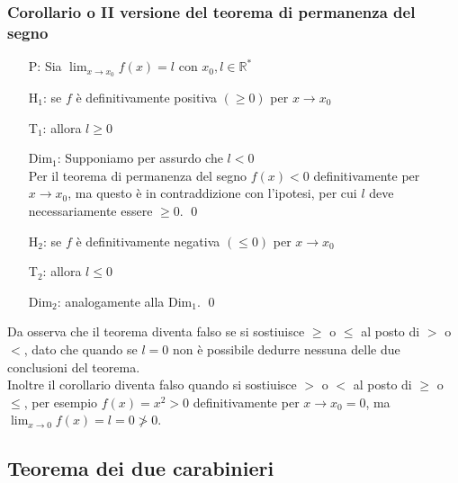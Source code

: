 \documentclass[a4paper]{article}
\begin{document}
\subsubsection*{Corollario o II versione del teorema di permanenza del segno}
\begin{itemize}
	\item[P:] Sia \(\displaystyle \lim_{x \to x_0} f(x) = l\) con \(x_0, l \in \mathbb{R}^*\)
	\item[H\(_1\):] se \(f\) è definitivamente positiva \(\left( \geq 0 \right)\) per \(x \to x_0\)
	\item[T\(_1\):] allora \(l \geq 0\)
	\item[Dim\(_1\):] Supponiamo per assurdo che \(l < 0\) \\
	Per il teorema di permanenza del segno \(f(x) < 0\) definitivamente per \(x \to x_0\), ma questo è in contraddizione con l'ipotesi,
	per cui \(l\) deve necessariamente essere \(\geq 0\). \qed

	\item[H\(_2\):] se \(f\) è definitivamente negativa \(\left( \leq 0 \right)\) per \(x \to x_0\)
	\item[T\(_2\):] allora \(l \leq 0\)
	\item[Dim\(_2\):] analogamente alla Dim\(_1\). \qed
\end{itemize}
Da osserva che il teorema diventa falso se si sostiuisce \(\geq\) o \(\leq\) al posto di \(>\) o \(<\), dato che quando se \(l = 0\) non è possibile dedurre nessuna delle due conclusioni del teorema. \\
Inoltre il corollario diventa falso quando si sostiuisce \(>\) o \(<\) al posto di \(\geq\) o \(\leq\), per esempio \(f(x) = x^2 > 0\) definitivamente per \(x \to x_0 = 0\), ma \(\displaystyle \lim_{x \to 0} f(x) = l = 0 \ngtr 0\).

\newpage


\subsection{Teorema dei due carabinieri}
\end{document}

